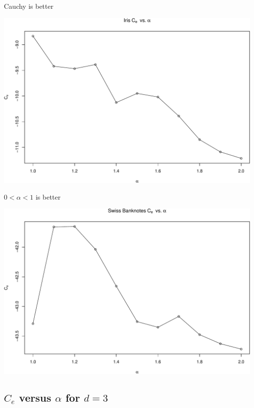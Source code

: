 \documentclass[ignorenonframetext,]{beamer}
\begin{document}
\begin{frame}{Cauchy is better}

\begin{center}\includegraphics[width=1\linewidth]{Presentation_files/figure-beamer/unnamed-chunk-20-1} \end{center}

\end{frame}

\begin{frame}{\(0<\alpha<1\) is better}

\begin{center}\includegraphics[width=1\linewidth]{Presentation_files/figure-beamer/unnamed-chunk-21-1} \end{center}

\end{frame}

\subsection{\texorpdfstring{\(C_e\) versus \(\alpha\) for
\(d = 3\)}{C\_e versus \textbackslash{}alpha for d = 3}}\label{c_e-versus-alpha-for-d-3}
\end{document}

